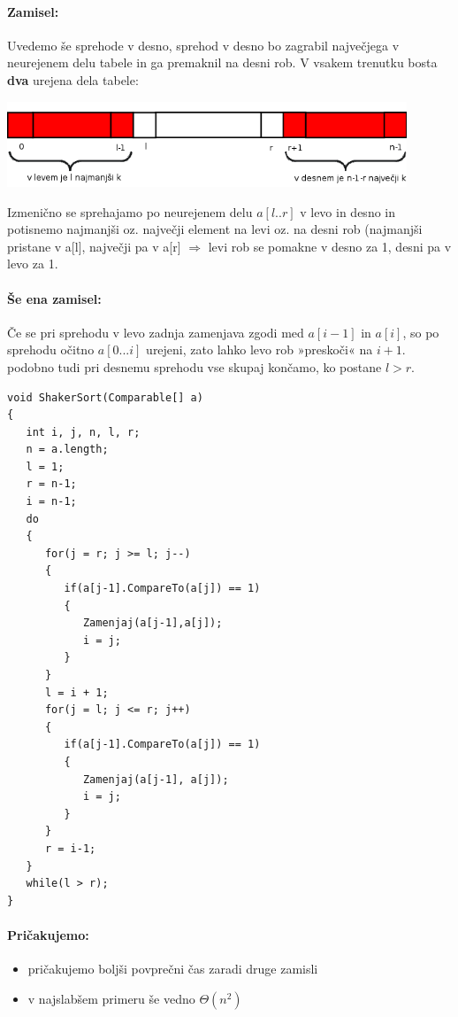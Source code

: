 \documentclass[a4paper,10pt]{article}
\begin{document}
\paragraph{Zamisel:}
Uvedemo \v se sprehode v desno, sprehod v desno bo zagrabil najve\v cjega v neurejenem delu tabele in ga premaknil na desni rob. V vsakem trenutku bosta \textbf{dva} urejena dela tabele:
	\begin{center}
	\includegraphics[width=11.95cm,height=2.55cm]{Slike/ShakerSortTabela.png}
	\end{center}
Izmeni\v cno se sprehajamo po neurejenem delu $a[l..r]$ v levo in desno in potisnemo najmanj\v si oz. najve\v cji element na levi oz. na desni rob (najmanj\v si pristane v a[l], najve\v cji pa v a[r] $\Rightarrow$ levi rob se pomakne v desno za 1, desni pa v levo za 1.

\paragraph{\v Se ena zamisel:}
\v Ce se pri sprehodu v levo zadnja zamenjava zgodi med $a[i-1]$ in $a[i]$, so po sprehodu o\v citno $a[0...i]$ urejeni, zato lahko levo rob »presko\v ci« na $i+1$.
podobno tudi pri desnemu sprehodu
vse skupaj kon\v camo, ko postane $l>r$.

\begin{lstlisting}[caption={Algoritem za sortiranje z izmeni\v cnimi zamenjavami}]
void ShakerSort(Comparable[] a)
{
   int i, j, n, l, r;
   n = a.length;
   l = 1;
   r = n-1;
   i = n-1;
   do
   {
      for(j = r; j >= l; j--)
      {
         if(a[j-1].CompareTo(a[j]) == 1)
         {
            Zamenjaj(a[j-1],a[j]);
            i = j;
         }
      }
      l = i + 1;
      for(j = l; j <= r; j++)
      {
         if(a[j-1].CompareTo(a[j]) == 1)
         {
            Zamenjaj(a[j-1], a[j]);
            i = j;
         }
      }
      r = i-1;
   }
   while(l > r);
}
\end{lstlisting}

\paragraph{Pri\v cakujemo:}
\begin{itemize}
\item pri\v cakujemo bolj\v si povpre\v cni \v cas zaradi druge zamisli
\item v najslab\v sem primeru \v se vedno $\Theta (n^2)$
\end{itemize}
\end{document}
